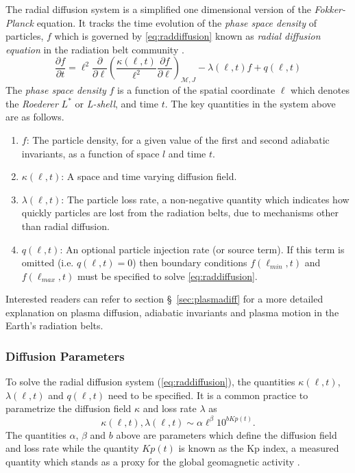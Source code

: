 The radial diffusion system is a simplified one dimensional version of the \emph{Fokker-Planck} 
equation. It tracks the time evolution of the \emph{phase space density} of particles, $f$ which is 
governed by \cref{eq:raddiffusion} known as \emph{radial diffusion equation} in the radiation belt 
community \citep{JGRA:JGRA9345}.
%
\begin{equation}\label{eq:raddiffusion}
  \frac{\partial{f}}{\partial{t}} = \ell^2 \frac{\partial}{\partial{\ell}} \left( 
    \frac{\kappa(\ell, t)}{\ell^{2}} \frac{\partial{f}}{\partial{\ell}}
  \right)_{\mathcal{M}, J} - \lambda(\ell, t) f + q(\ell, t)
\end{equation}
%
The \emph{phase space density} $f$ is a function of the spatial coordinate $\ell$ which denotes the 
\emph{Roederer} $L^*$ or \emph{L-shell}, and time $t$. The key quantities in the system above are 
as follows.
%
\begin{enumerate}
\item $f$: The particle density, for a given value of the first and second adiabatic invariants, 
as a function of space $l$ and time $t$.
\item $\kappa(\ell, t)$: A space and time varying diffusion field.
\item $\lambda(\ell, t)$: The particle loss rate, a non-negative quantity which indicates how 
quickly particles are lost from the radiation belts, due to mechanisms other than radial diffusion.
\item $q(\ell, t)$: An optional particle injection rate (or source term). If this term is omitted 
      (i.e. $q(\ell, t) = 0$) then boundary conditions $f(\ell_{min}, t)$ and $f(\ell_{max}, t)$ 
      must be specified to solve \cref{eq:raddiffusion}. 
\end{enumerate}
%
Interested readers can refer to section \S~\ref{sec:plasmadiff} for a more detailed explanation on 
plasma diffusion, adiabatic invariants and plasma motion in the Earth's radiation belts. 

\subsubsection*{Diffusion Parameters}

To solve the radial diffusion system (\cref{eq:raddiffusion}), the quantities $\kappa(\ell, t)$, 
$\lambda(\ell, t)$ and $q(\ell, t)$ need to be specified. It is a common practice 
\citetext{see \citealp{GRL:GRL10762}, \citealp{JGRA:JGRA15067}, \citealp{JGRA:JGRA18021} and
\citealp{GRL:GRL22815}} to parametrize the diffusion field $\kappa$ and loss rate $\lambda$ as 
%
\begin{equation}\label{eq:paramExp}
  \kappa(\ell, t), \lambda(\ell, t) \sim \alpha \ell^{\beta} 10^{b Kp(t)}.
\end{equation}
%
The quantities $\alpha$, $\beta$ and $b$ above are parameters which define the diffusion field and 
loss rate while the quantity $Kp(t)$ is known as the Kp index, a measured quantity which stands as 
a proxy for the global geomagnetic activity \citep{BartelsKp}.

